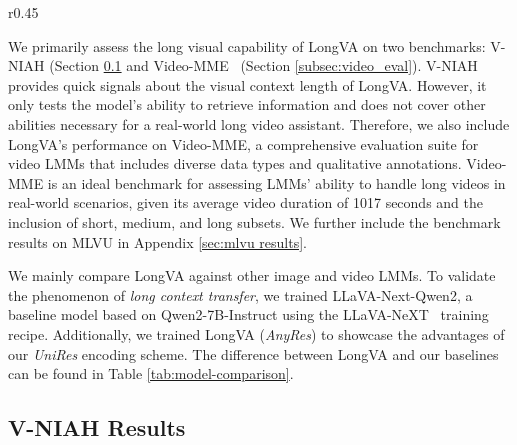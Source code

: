 \begin{wraptable}{r}{0.45\textwidth}
\begin{center}
\end{center}
\caption{LongVA and its baselines.}
\label{tab:model-comparison}
\end{wraptable}

We primarily assess the long visual capability of LongVA on two benchmarks: V-NIAH (Section \ref{subsec:vniah} and Video-MME~\citep{fu2024videomme} (Section \ref{subsec:video_eval}).  V-NIAH provides quick signals about the visual context length of LongVA. However, it only tests the model's ability to retrieve information and does not cover other abilities necessary for a real-world long video assistant. Therefore, we also include LongVA's performance on Video-MME,  a comprehensive evaluation suite for video LMMs that includes diverse data types and qualitative annotations. Video-MME is an ideal benchmark for assessing LMMs' ability to handle long videos in real-world scenarios, given its average video duration of 1017 seconds and the inclusion of short, medium, and long subsets.  We further include the benchmark results on MLVU\citep{zhou2024mlvu} in Appendix \ref{sec:mlvu results}.

We mainly compare LongVA against other image and video LMMs. To validate the phenomenon of \textit{long context transfer}, we trained LLaVA-Next-Qwen2, a baseline model based on Qwen2-7B-Instruct using the LLaVA-NeXT~\cite{liu2023improvedllava, li2024llavanext-ablations} training recipe. Additionally, we trained LongVA (\textit{AnyRes}) to showcase the advantages of our \textit{UniRes} encoding scheme. The difference between LongVA and our baselines can be found in Table \ref{tab:model-comparison}.

\subsection{V-NIAH Results}
\label{subsec:vniah}

